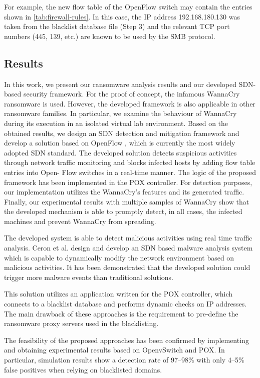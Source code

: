 \documentclass[12pt,letterpaper]{article}
\begin{document}
        For example, the new flow table of the OpenFlow switch may contain the entries shown in \autoref{tab:firewall-rules}. In this case, the IP address 192.168.180.130 was taken from the blacklist database file (Step 3) and the relevant TCP port numbers (445, 139, etc.) are known to be used by the SMB protocol.

    \subsection{Results}

    In this work, we present our ransomware analysis results and our developed SDN-based security framework. For the proof of concept, the infamous WannaCry ransomware is used. However, the developed framework is also applicable in other ransomware families. In particular, we examine the behaviour of WannaCry during its execution in an isolated virtual lab environment. Based on the obtained results, we design an SDN detection and mitigation framework and develop a solution based on OpenFlow \cite{10.1145/1355734.1355746, KazuyaSUZUKI2014}, which is currently the most widely adopted SDN standard. The developed solution detects suspicious activities through network traffic monitoring and blocks infected hosts by adding flow table entries into Open- Flow switches in a real-time manner. The logic of the proposed framework has been implemented in the POX controller. For detection purposes, our implementation utilizes the WannaCry’s features and its generated traffic. Finally, our experimental results with multiple samples of WannaCry show that the developed mechanism is able to promptly detect, in all cases, the infected machines and prevent WannaCry from spreading.

    The developed system is able to detect malicious activities using real time traffic analysis. Ceron et al. \cite{7543792} design and develop an SDN based malware analysis system which is capable to dynamically modify the network environment based on malicious activities. It has been demonstrated that the developed solution could trigger more malware events than traditional solutions.

    This solution utilizes an application written for the POX controller, which connects to a blacklist database and performs dynamic checks on IP addresses. The main drawback of these approaches is the requirement to pre-define the ransomware proxy servers used in the blacklisting.

    The feasibility of the proposed approaches has been confirmed by implementing and obtaining experimental results based on OpenvSwitch and POX. In particular, simulation results show a detection rate of 97–98\% with only 4–5\% false positives when relying on blacklisted domains.
\end{document}

